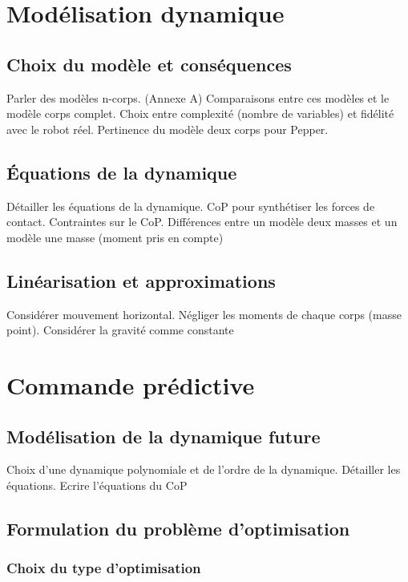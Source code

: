 \section{Modélisation dynamique}
\subsection{Choix du modèle et conséquences}

Parler des modèles n-corps. (Annexe A)
Comparaisons entre ces modèles et le modèle corps complet.
Choix entre complexité (nombre de variables) et fidélité avec le robot réel.
Pertinence du modèle deux corps pour Pepper.

\subsection{Équations de la dynamique}

Détailler les équations de la dynamique.
CoP pour synthétiser les forces de contact.
Contraintes sur le CoP.
Différences entre un modèle deux masses et un modèle une masse (moment pris en compte)

\subsection{Linéarisation et approximations}

Considérer mouvement horizontal.
Négliger les moments de chaque corps (masse point).
Considérer la gravité comme constante


\section{Commande prédictive}
\subsection{Modélisation de la dynamique future}

Choix d'une dynamique polynomiale et de l'ordre de la dynamique.
Détailler les équations.
Ecrire l'équations du CoP


\subsection{Formulation du problème d'optimisation}
\subsubsection{Choix du type d'optimisation}

